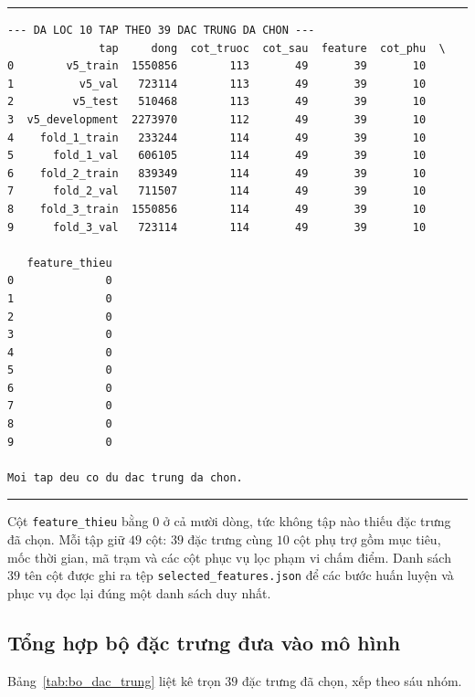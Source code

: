 \begingroup
\par\vspace{6pt}\hrule\vspace{4pt}
\small\renewcommand{\baselinestretch}{1.0}\selectfont
\begin{verbatim}
--- DA LOC 10 TAP THEO 39 DAC TRUNG DA CHON ---
              tap     dong  cot_truoc  cot_sau  feature  cot_phu  \
0        v5_train  1550856        113       49       39       10   
1          v5_val   723114        113       49       39       10   
2         v5_test   510468        113       49       39       10   
3  v5_development  2273970        112       49       39       10   
4    fold_1_train   233244        114       49       39       10   
5      fold_1_val   606105        114       49       39       10   
6    fold_2_train   839349        114       49       39       10   
7      fold_2_val   711507        114       49       39       10   
8    fold_3_train  1550856        114       49       39       10   
9      fold_3_val   723114        114       49       39       10   

   feature_thieu  
0              0  
1              0  
2              0  
3              0  
4              0  
5              0  
6              0  
7              0  
8              0  
9              0  

Moi tap deu co du dac trung da chon.
\end{verbatim}
\vspace{2pt}\hrule\par\vspace{6pt}
\endgroup

Cột \texttt{feature\_thieu} bằng $0$ ở cả mười dòng, tức không tập nào thiếu đặc trưng đã chọn.
Mỗi tập giữ $49$ cột: $39$ đặc trưng cùng $10$ cột phụ trợ gồm mục tiêu, mốc thời gian, mã trạm
và các cột phục vụ lọc phạm vi chấm điểm. Danh sách $39$ tên cột được ghi ra tệp
\texttt{selected\_features.json} để các bước huấn luyện và phục vụ đọc lại đúng một danh sách duy
nhất.

\subsection{Tổng hợp bộ đặc trưng đưa vào mô hình}

Bảng~\ref{tab:bo_dac_trung} liệt kê trọn $39$ đặc trưng đã chọn, xếp theo sáu nhóm.

